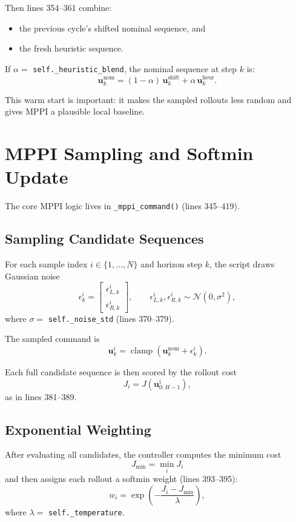 \documentclass[11pt]{article}
\begin{document}
Then lines 354--361 combine:
\begin{itemize}
\item the previous cycle's shifted nominal sequence, and
\item the fresh heuristic sequence.
\end{itemize}

If $\alpha =$ \texttt{self.\_heuristic\_blend}, the nominal sequence at step
$k$ is:
\[
\mathbf{u}^{\mathrm{nom}}_k
=
(1-\alpha)\,\mathbf{u}^{\mathrm{shift}}_k
+ \alpha\,\mathbf{u}^{\mathrm{heur}}_k.
\]

This warm start is important: it makes the sampled rollouts less random and
gives MPPI a plausible local baseline.

\section{MPPI Sampling and Softmin Update}

The core MPPI logic lives in \texttt{\_mppi\_command()} (lines 345--419).

\subsection{Sampling Candidate Sequences}

For each sample index $i \in \{1,\dots,N\}$ and horizon step $k$, the script
draws Gaussian noise
\[
\epsilon^i_k =
\begin{bmatrix}
\epsilon^i_{L,k} \\
\epsilon^i_{R,k}
\end{bmatrix},
\qquad
\epsilon^i_{L,k}, \epsilon^i_{R,k}
\sim \mathcal{N}(0,\sigma^2),
\]
where $\sigma =$ \texttt{self.\_noise\_std} (lines 370--379).

The sampled command is
\[
\mathbf{u}^i_k
=
\operatorname{clamp}\!\left(\mathbf{u}^{\mathrm{nom}}_k + \epsilon^i_k\right).
\]

Each full candidate sequence is then scored by the rollout cost
\[
J_i = J(\mathbf{u}^i_{0:H-1}),
\]
as in lines 381--389.

\subsection{Exponential Weighting}

After evaluating all candidates, the controller computes the minimum cost
\[
J_{\min} = \min_i J_i
\]
and then assigns each rollout a softmin weight (lines 393--395):
\[
w_i = \exp\!\left(-\frac{J_i - J_{\min}}{\lambda}\right),
\]
where $\lambda =$ \texttt{self.\_temperature}.
\end{document}
